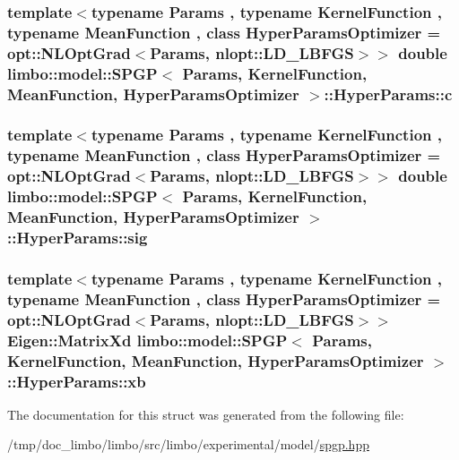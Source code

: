 \subsubsection[{\texorpdfstring{c}{c}}]{\setlength{\rightskip}{0pt plus 5cm}template$<$typename Params , typename Kernel\+Function , typename Mean\+Function , class Hyper\+Params\+Optimizer  = opt\+::\+N\+L\+Opt\+Grad$<$\+Params, nlopt\+::\+L\+D\+\_\+\+L\+B\+F\+G\+S$>$$>$ double {\bf limbo\+::model\+::\+S\+P\+GP}$<$ Params, Kernel\+Function, Mean\+Function, Hyper\+Params\+Optimizer $>$\+::Hyper\+Params\+::c}\hypertarget{structlimbo_1_1model_1_1_s_p_g_p_1_1_hyper_params_ac7851b66eb3556f595b949ca241fef09}{}\label{structlimbo_1_1model_1_1_s_p_g_p_1_1_hyper_params_ac7851b66eb3556f595b949ca241fef09}
\subsubsection[{\texorpdfstring{sig}{sig}}]{\setlength{\rightskip}{0pt plus 5cm}template$<$typename Params , typename Kernel\+Function , typename Mean\+Function , class Hyper\+Params\+Optimizer  = opt\+::\+N\+L\+Opt\+Grad$<$\+Params, nlopt\+::\+L\+D\+\_\+\+L\+B\+F\+G\+S$>$$>$ double {\bf limbo\+::model\+::\+S\+P\+GP}$<$ Params, Kernel\+Function, Mean\+Function, Hyper\+Params\+Optimizer $>$\+::Hyper\+Params\+::sig}\hypertarget{structlimbo_1_1model_1_1_s_p_g_p_1_1_hyper_params_aaefda5ae138a733a9435e9922582684c}{}\label{structlimbo_1_1model_1_1_s_p_g_p_1_1_hyper_params_aaefda5ae138a733a9435e9922582684c}
\subsubsection[{\texorpdfstring{xb}{xb}}]{\setlength{\rightskip}{0pt plus 5cm}template$<$typename Params , typename Kernel\+Function , typename Mean\+Function , class Hyper\+Params\+Optimizer  = opt\+::\+N\+L\+Opt\+Grad$<$\+Params, nlopt\+::\+L\+D\+\_\+\+L\+B\+F\+G\+S$>$$>$ Eigen\+::\+Matrix\+Xd {\bf limbo\+::model\+::\+S\+P\+GP}$<$ Params, Kernel\+Function, Mean\+Function, Hyper\+Params\+Optimizer $>$\+::Hyper\+Params\+::xb}\hypertarget{structlimbo_1_1model_1_1_s_p_g_p_1_1_hyper_params_a867369e27386e051b800653e759443b2}{}\label{structlimbo_1_1model_1_1_s_p_g_p_1_1_hyper_params_a867369e27386e051b800653e759443b2}


The documentation for this struct was generated from the following file\+:\begin{DoxyCompactItemize}
\item 
/tmp/doc\+\_\+limbo/limbo/src/limbo/experimental/model/\hyperlink{spgp_8hpp}{spgp.\+hpp}\end{DoxyCompactItemize}
